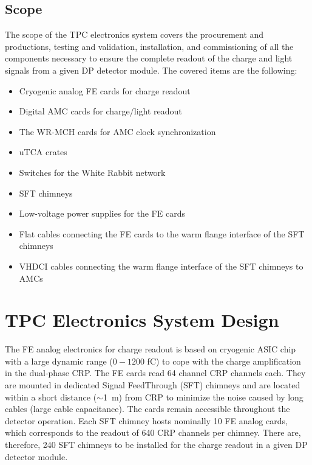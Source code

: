 

\subsection{Scope}
\label{sec:fddp-tpc-elec-scope}

The scope of the TPC electronics system covers the procurement and productions, testing and validation, installation, and commissioning of all the components necessary to ensure the complete readout of the charge and light signals from a given DP detector module. The covered items are the following:
\begin{itemize}
\item{Cryogenic analog FE cards for charge readout}
\item{Digital AMC cards for charge/light readout}
\item{The WR-MCH cards for AMC clock synchronization}
\item{uTCA crates}
\item{Switches for the White Rabbit network}
\item{SFT chimneys}
\item{Low-voltage power supplies for the FE cards}
\item{Flat cables connecting the FE cards to the warm flange interface of the SFT chimneys}
\item{VHDCI cables connecting the warm flange interface of the SFT chimneys to AMCs}
\end{itemize}



\section{TPC Electronics System Design}
\label{sec:fddp-tpc-elec-design}

The FE analog electronics for charge readout is based on cryogenic ASIC chip with a large dynamic range ($0-1200$ \si{fC}) to cope with the charge amplification in the dual-phase CRP. The FE cards read \num{64} channel CRP channels each. They are mounted in dedicated Signal FeedThrough (SFT) chimneys and are located within a short distance ($\sim$\SI{1}{\metre}) from CRP to minimize the noise caused by long cables (large cable capacitance). The cards remain accessible throughout the detector operation. Each SFT chimney hosts nominally \num{10} FE analog cards, which corresponds to the readout of \num{640} CRP channels per chimney. There are, therefore, \num{240} SFT chimneys to be installed for the charge readout in a given DP detector module.   

